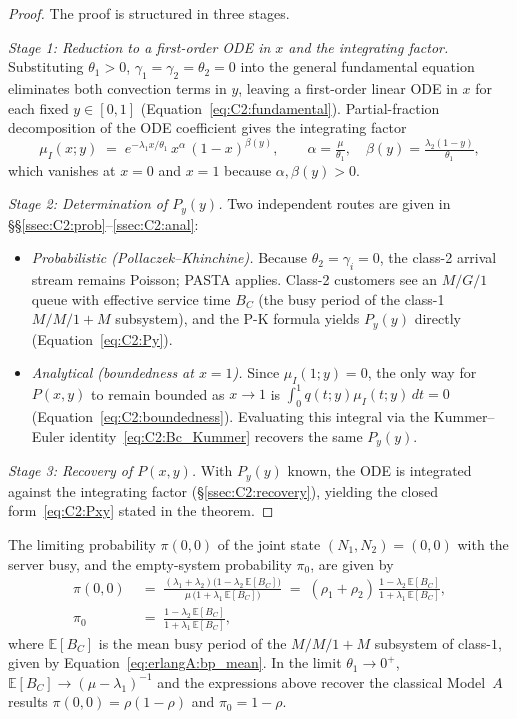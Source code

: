 \begin{proof}
The proof is structured in three stages.

\emph{Stage 1: Reduction to a first-order ODE in $x$ and the integrating factor.}  Substituting $\theta_1>0$, $\gamma_1=\gamma_2=\theta_2=0$ into the general fundamental equation eliminates both convection terms in $y$, leaving a first-order linear ODE in $x$ for each fixed $y\in[0,1]$ (Equation~\eqref{eq:C2:fundamental}).  Partial-fraction decomposition of the ODE coefficient gives the integrating factor
\[
    \mu_I(x;y) \;=\; e^{-\lambda_1 x/\theta_1}\,x^{\alpha}\,(1-x)^{\beta(y)},
    \qquad \alpha=\tfrac{\mu}{\theta_1},\quad \beta(y)=\tfrac{\lambda_2(1-y)}{\theta_1},
\]
which vanishes at $x=0$ and $x=1$ because $\alpha,\beta(y)>0$.

\emph{Stage 2: Determination of $P_y(y)$.}  Two independent routes are given in \S\S\ref{ssec:C2:prob}--\ref{ssec:C2:anal}:
\begin{itemize}
  \item \emph{Probabilistic (Pollaczek--Khinchine).}  Because $\theta_2=\gamma_i=0$, the class-2 arrival stream remains Poisson; PASTA applies.  Class-2 customers see an $M/G/1$ queue with effective service time $B_C$ (the busy period of the class-1 $M/M/1{+}M$ subsystem), and the P-K formula yields $P_y(y)$ directly (Equation~\eqref{eq:C2:Py}).
  \item \emph{Analytical (boundedness at $x=1$).}  Since $\mu_I(1;y)=0$, the only way for $P(x,y)$ to remain bounded as $x\to1$ is $\int_0^1 q(t;y)\mu_I(t;y)\,dt=0$ (Equation~\eqref{eq:C2:boundedness}).  Evaluating this integral via the Kummer--Euler identity~\eqref{eq:C2:Bc_Kummer} recovers the same $P_y(y)$.
\end{itemize}

\emph{Stage 3: Recovery of $P(x,y)$.}  With $P_y(y)$ known, the ODE is integrated against the integrating factor (\S\ref{ssec:C2:recovery}), yielding the closed form~\eqref{eq:C2:Pxy} stated in the theorem.
\end{proof}

\begin{corollary}\label{cor:C2:pi00}
    The limiting probability $\pi(0,0)$ of the joint state $(N_1,N_2)=(0,0)$ with the server busy, and the empty-system probability $\pi_0$, are given by
    \begin{align}
        \pi(0,0) \;&=\; \frac{(\lambda_1+\lambda_2)\bigl(1 - \lambda_2\,\mathbb{E}[B_C]\bigr)}{\mu\,\bigl(1 + \lambda_1\,\mathbb{E}[B_C]\bigr)} \;=\; (\rho_1+\rho_2)\,\frac{1 - \lambda_2\,\mathbb{E}[B_C]}{1 + \lambda_1\,\mathbb{E}[B_C]}, \label{eq:C2:pi00}\\[4pt]
        \pi_0 \;&=\; \frac{1 - \lambda_2\,\mathbb{E}[B_C]}{1 + \lambda_1\,\mathbb{E}[B_C]}, \label{eq:C2:pi0}
    \end{align}
    where $\mathbb{E}[B_C]$ is the mean busy period of the $M/M/1+M$ subsystem of class-$1$, given by Equation~\eqref{eq:erlangA:bp_mean}. In the limit $\theta_1\to 0^+$, $\mathbb{E}[B_C]\to (\mu-\lambda_1)^{-1}$ and the expressions above recover the classical Model~$A$ results $\pi(0,0) = \rho(1-\rho)$ and $\pi_0 = 1-\rho$.
\end{corollary}

